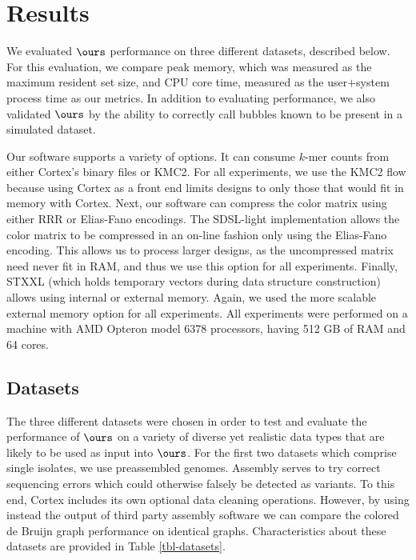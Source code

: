 \section{Results}
\label{sec:results} 
We evaluated $\ours$ performance on three different datasets, described below.  For this evaluation, we compare peak memory, which was measured as the maximum resident set size, and CPU core time, measured as the user$+$system process time as our metrics.  In addition to evaluating performance, we also validated $\ours$ by the ability to correctly call bubbles known to be present in a simulated dataset.

Our software supports a variety of options.  It can consume $k$-mer counts from either Cortex's binary files or KMC2.  For all experiments, we use the KMC2 flow because using Cortex as a front end limits designs to only those that would fit in memory with Cortex.  Next, our software can compress the color matrix using either RRR or Elias-Fano encodings.  The SDSL-light implementation allows the color matrix to be compressed in an on-line fashion only using the Elias-Fano encoding.  This allows us to process larger designs, as the uncompressed matrix need never fit in RAM, and thus we use this option for all experiments.  Finally, STXXL (which holds temporary vectors during data structure construction) allows using internal or external memory.  Again, we used the more scalable external memory option for all experiments.
All experiments were performed on a machine with AMD Opteron model 6378 processors, having 512 GB of RAM and 64 cores. 




\subsection{Datasets} \label{data}



The three different datasets were chosen in order to test and evaluate the performance of $\ours$ on a variety of diverse yet realistic data types that are likely to be used as input into $\ours$.  For the first two datasets which comprise single isolates, we use preassembled genomes.  Assembly serves to try correct sequencing errors which could otherwise falsely be detected as variants. To this end, {\sc Cortex} includes its own optional data cleaning operations.  However, by using instead the output of third party assembly software we can compare the colored de Bruijn graph performance on identical graphs.  Characteristics about these datasets are provided in Table \ref{tbl-datasets}.

